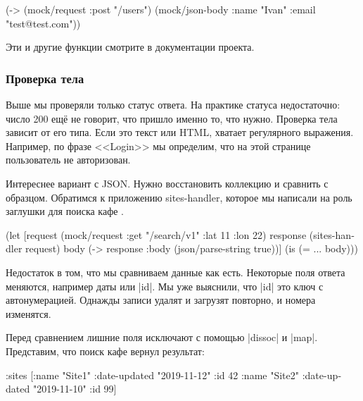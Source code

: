 \begin{english}
  \begin{clojure}
(-> (mock/request :post "/users")
    (mock/json-body {:name "Ivan" :email "test@test.com"}))
  \end{clojure}
\end{english}

\noindent
Эти и другие функции смотрите в документации проекта.

\subsubsection*{Проверка тела}

Выше мы проверяли только статус ответа. На практике статуса недостаточно: число
200 ещё не говорит, что пришло именно то, что нужно. Проверка тела зависит от
его типа. Если это текст или HTML, хватает регулярного выражения. Например, по
фразе <<Login>> мы определим, что на этой странице пользователь не авторизован.


Интереснее вариант с JSON. Нужно восстановить коллекцию и сравнить с
образцом. Обратимся к приложению sites-handler, которое мы написали на роль
заглушки для поиска кафе .

\begin{english}
  \begin{clojure}
(let [request (mock/request :get "/search/v1"
                            {:lat 11 :lon 22})
      response (sites-handler request)
      body (-> response :body (json/parse-string true))]
  (is (= {...} body)))
  \end{clojure}
\end{english}

Недостаток в том, что мы сравниваем данные как есть. Некоторые поля ответа
меняются, например даты или \spverb|id|. Мы уже выяснили, что \spverb|id| это
ключ с автонумерацией. Однажды записи удалят и загрузят повторно, и номера
изменятся.

Перед сравнением лишние поля исключают с помощью \spverb|dissoc| и
\spverb|map|. Представим, что поиск кафе вернул результат:

\begin{english}
  \begin{clojure}
{:sites [{:name "Site1" :date-updated "2019-11-12" :id 42}
         {:name "Site2" :date-updated "2019-11-10" :id 99}]}
  \end{clojure}
\end{english}

